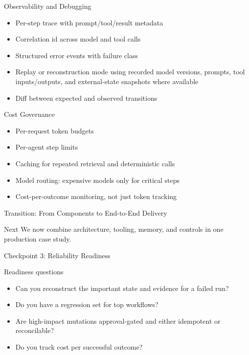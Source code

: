 \documentclass[aspectratio=169]{beamer}
\begin{document}
\begin{frame}{Observability and Debugging}
  \begin{itemize}
    \item Per-step trace with prompt/tool/result metadata
    \item Correlation id across model and tool calls
    \item Structured error events with failure class
    \item Replay or reconstruction mode using recorded model versions, prompts, tool inputs/outputs, and external-state snapshots where available
    \item Diff between expected and observed transitions
  \end{itemize}
\end{frame}

\begin{frame}{Cost Governance}
  \begin{itemize}
    \item Per-request token budgets
    \item Per-agent step limits
    \item Caching for repeated retrieval and deterministic calls
    \item Model routing: expensive models only for critical steps
    \item Cost-per-outcome monitoring, not just token tracking
  \end{itemize}
\end{frame}

\begin{frame}{Transition: From Components to End-to-End Delivery}
  \begin{block}{Next}
    We now combine architecture, tooling, memory, and controls in one production case study.
  \end{block}
\end{frame}

\begin{frame}{Checkpoint 3: Reliability Readiness}
  \begin{examplebox}{Readiness questions}
    \begin{itemize}
      \item Can you reconstruct the important state and evidence for a failed run?
      \item Do you have a regression set for top workflows?
      \item Are high-impact mutations approval-gated and either idempotent or reconcilable?
      \item Do you track cost per successful outcome?
    \end{itemize}
  \end{examplebox}
\end{frame}
\end{document}
